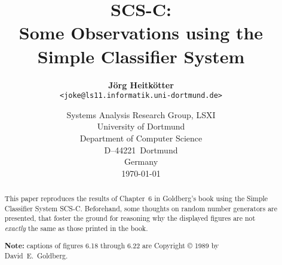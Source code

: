 

\baselineskip
\parindent=0pt
\pagestyle{headings}

\def\MathRoman#1{{\ifmmode {\rm #1}\else $\rm #1$\fi}}

\def\Mtpi{\M_{\mbox{\scriptsize TP3.0}}^{\mbox{\scriptsize integer(2)}}}
\def\Mtpr{\M_{\mbox{\scriptsize TP3.0}}^{\mbox{\scriptsize real(6:12)}}}

\def\Mieeef{\M_{\mbox{\scriptsize IEEE}}^{\mbox{\scriptsize float(4:7)}}}
\def\Mieeed{\M_{\mbox{\scriptsize IEEE}}^{\mbox{\scriptsize double(8:15)}}}
\def\Mieeex{\M_{\mbox{\scriptsize IEEE}}^{\mbox{\scriptsize long double(10:15)}}}

\def\Mgeneric{\M_{\mbox{\scriptsize $<$implementation$>$}}^{\mbox{\scriptsize $<$type$>$($<$bytes$>$:$<$precision$>$)}}}

\def\M{\MathRoman{I\kern -0.2em M}}

\newtheorem{hype}{Hypothesis}

\title{\huge SCS-C:					\\
	Some Observations using the			\\
	Simple Classifier System
}

\author{{\bf J\"org Heitk\"otter}			\\
	\verb+<joke@ls11.informatik.uni-dortmund.de>+
}
\date{	Systems Analysis Research Group, LSXI		\\
	University of Dortmund 				\\
	Department of Computer Science	 		\\
	D--44221~Dortmund				\\
	Germany						\\
	\vspace{3ex}
	\today
}



\maketitle
\thispagestyle{empty}

\begin{abstract}
This paper reproduces the results of Chapter~6 in Goldberg's book using
the Simple Classifier System SCS-C.
Beforehand, some thoughts on random number generators are presented,
that foster the ground for reasoning why the displayed figures are
not {\em exactly} the same as those printed in the book.

{\bf Note:} captions of figures 6.18 through 6.22 are Copyright \copyright{} 1989 by
David~E.~Goldberg\nocite{Goldberg:89e}.
\end{abstract}


